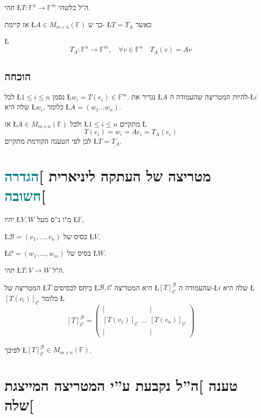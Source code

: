 \documentclass[english,hebrew]{article}
\begin{document}
תהי \L{$T:\mathbb{F}^{n}\to\mathbb{F}^{m}$} ה"ל כלשהי.

אז קיימת \L{$A\in M_{m\times n}(\mathbb{F})$} כך ש- \L{$T=T_{A}$}
כאשר

\L{%
\[
T_{A}:\mathbb{F}^{n}\rightarrow\mathbb{F}^{m},\quad\forall v\in\mathbb{F}^{n}\quad T_{A}(v)=Av
\]
}%

\subsection{הוכחה}

לכל \L{$1\le i\le n$} נסמן \L{$w_{i}=T(e_{i})\in\mathbb{F}^{m}$}.
נגדיר את \L{$A$} להיות המטריצה שהעמודה ה-\L{$i$} שלה היא \L{$w_{i}$},
כלומר \L{$A=(w_{1}\dots w_{n})$}. 

אז \L{$A\in M_{m\times n}(\mathbb{F})$} ולכל \L{$1\le i\le n$} מתקיים
\L{%
\[
T(e_{i})=w_{i}=Ae_{i}=T_{A}(e_{i})
\]
}%
לכן לפי הטענה הקודמת מתקיים \L{$T=T_{A}$}.

\section{מטריצה של העתקה ליניארית {]}\textcolor{teal}{הגדרה חשובה}{[}}

יהיו \L{$V,W$} מ"ו נ\textquotedblright ס מעל \L{$\mathbb{F}$},

\L{$\mathcal{B}=(v_{1},\dots,v_{n})$} בסיס של \L{$V$},

\L{$\mathcal{C}=(w_{1},\dots,w_{m})$} בסיס של \L{$W$}.

תהי \L{$T:V\to W$} ה"ל.

המטריצה של \L{$T$} ביחס לבסיסים \L{$\mathcal{B},\mathcal{C}$} היא
המטריצה \L{$[T]_{\mathcal{C}}^{\mathcal{B}}$} שהעמודה ה-\L{$i$}
שלה היא \L{$[T(v_{i})]_{\mathcal{C}}$} כלומר \L{%
\[
[T]_{\mathcal{C}}^{\mathcal{B}}=\left(\begin{array}{c}
|\\{}
[T(v_{1})]_{\mathcal{C}}\\
|
\end{array}\dots\begin{array}{c}
|\\{}
[T(v_{n})]_{\mathcal{C}}\\
|
\end{array}\right)
\]
}%

לפיכך \L{$[T]_{\mathcal{C}}^{\mathcal{B}}\in M_{m\times n}(\mathbb{F})$}.

\section{טענה {]}ה\textquotedblright ל נקבעת ע\textquotedblright י המטריצה
המייצגת שלה{[}}
\end{document}
